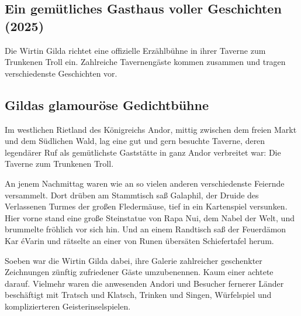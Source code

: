 \begin{chapterbox}
    \chapter{Ein gemütliches Gasthaus voller Geschichten (2025)}
    \label{2025-ein-gemuetliches-gasthaus-voller-geschichten}
    
    Die Wirtin Gilda richtet eine offizielle Erzählbühne in ihrer Taverne zum Trunkenen Troll ein. Zahlreiche Tavernengäste kommen zusammen und tragen verschiedenste Geschichten vor.

\end{chapterbox}



\extramarks{}{ } %

\newpage
\section{Gildas glamouröse Gedichtbühne}



Im westlichen Rietland des Königreichs Andor, mittig zwischen dem freien Markt und dem Südlichen Wald, lag eine gut und gern besuchte Taverne, deren legendärer Ruf als gemütlichste Gaststätte in ganz Andor verbreitet war: Die Taverne zum Trunkenen Troll. 

An jenem Nachmittag waren wie an so vielen anderen verschiedenste Feiernde versammelt. Dort drüben am Stammtisch saß Galaphil, der Druide des Verlassenen Turmes der großen Fledermäuse, tief in ein Kartenspiel versunken. Hier vorne stand eine große Steinstatue von Rapa Nui, dem Nabel der Welt, und brummelte fröhlich vor sich hin. Und an einem Randtisch saß der Feuerdämon Kar éVarin und rätselte an einer von Runen übersäten Schiefertafel herum.

Soeben war die Wirtin Gilda dabei, ihre Galerie zahlreicher geschenkter Zeichnungen zünftig zufriedener Gäste umzubenennen. Kaum einer achtete darauf. Vielmehr waren die anwesenden Andori und Besucher fernerer Länder beschäftigt mit Tratsch und Klatsch, Trinken und Singen, Würfelspiel und komplizierteren Geisterinselspielen. 

